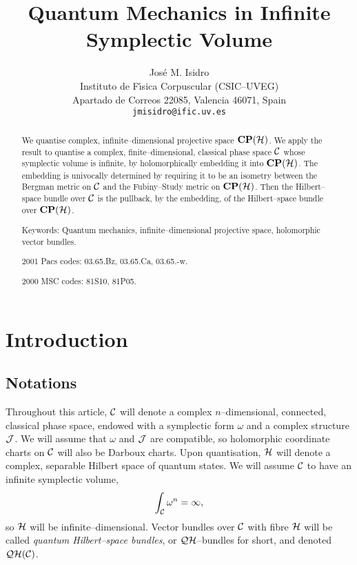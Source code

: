 \documentclass[a4paper,a4paper]{article}
\begin{document}
\title{Quantum Mechanics in Infinite Symplectic Volume}
\author{Jos\'e M. Isidro\\
Instituto de F\'{\i}sica Corpuscular (CSIC--UVEG)\\
Apartado de Correos 22085, Valencia 46071, Spain\\
{\tt jmisidro@ific.uv.es}}


\maketitle


\begin{abstract}
We quantise complex, infinite--dimensional projective space ${\bf CP}({\cal H})$.
We apply the result to quantise a complex, finite--dimensional, classical phase space 
${\cal C}$ whose symplectic volume is infinite, by holomorphically embedding it into 
${\bf CP}({\cal H})$. The embedding is univocally determined by requiring it to be an isometry 
between the Bergman metric on ${\cal C}$ and the Fubiny--Study metric on ${\bf CP}({\cal H})$.
Then the Hilbert--space bundle over ${\cal C}$ is the pullback, by the 
embedding, of the Hilbert--space bundle over ${\bf CP}({\cal H})$. 

Keywords: Quantum mechanics, infinite--dimensional projective space, holomorphic vector bundles.

2001 Pacs codes: 03.65.Bz, 03.65.Ca, 03.65.-w. 

2000 MSC codes: 81S10, 81P05.


\end{abstract}


\tableofcontents





\section{Introduction}\label{inntt}


\subsection{Notations}\label{nta}


Throughout this article, ${\cal C}$ will denote a complex $n$--dimensional, connected, 
classical phase space, endowed with a symplectic form $\omega$ 
and a complex structure ${\cal J}$. We will assume that $\omega$ and ${\cal J}$ 
are compatible, so holomorphic coordinate charts on ${\cal C}$ will also 
be Darboux charts. Upon quantisation, ${\cal H}$ will denote a complex, 
separable Hilbert space of quantum states. We will assume ${\cal C}$ to have an infinite 
symplectic volume,
\begin{equation}
\int_{\cal C}\omega^n = \infty,
\label{isxvcc}
\end{equation}
so ${\cal H}$ will be infinite--dimensional. Vector bundles over ${\cal C}$ with fibre 
${\cal H}$ will be called {\it quantum Hilbert--space bundles}, or ${\cal QH}$--bundles 
for short, and denoted ${\cal QH}({\cal C})$.
\end{document}
